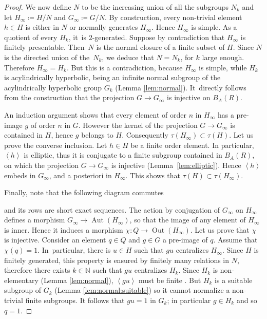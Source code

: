 \documentclass[JEP,XML,SOM,Unicode]{cedram}
\theoremstyle{definition}
\newcommand{\Aut}{\operatorname{Aut}}
\newcommand{\Out}{\operatorname{Out}}
\begin{document}
\begin{proof}
We now define $N$ to be the increasing union of all the subgroups $N_k$ and let $H_\infty \coloneqq H/N$ and $G_\infty \coloneqq G/N$.
By construction, every non-trivial element $h \in H$ is either in $N$ or normally generates $H_\infty$.
Hence $H_\infty$ is simple.
As a quotient of every $H_k$, it~is $2$-generated.
Suppose by contradiction that $H_\infty$ is finitely presentable.
Then~$N$ is the normal closure of a finite subset of $H$.
Since $N$ is the directed union of the~$N_k$, we deduce that $N = N_k$, for $k$ large enough.
Therefore $H_\infty = H_k$.
But this is a contradiction, because $H_\infty$ is simple, while $H_k$ is acylindrically hyperbolic, being an infinite normal subgroup of the acylindrically hyperbolic group $G_k$ (Lemma \ref{lem:normal}).
It~directly follows from the construction that the projection $G \to G_\infty$ is injective on $B_A(R)$.

An induction argument shows that every element of order $n$ in $H_\infty$ has a pre-image $g$ of order $n$ in $G$.
However the kernel of the projection $G \to G_\infty$ is contained in $H$, hence $g$ belongs to $H$.
Consequently $\tau(H_\infty) \subset \tau(H)$.
Let us prove the converse inclusion.
Let $h \in H$ be a finite order element.
In particular, $\left<h \right>$ is elliptic, thus it is conjugate to a finite subgroup contained in $B_A(R)$, on which the projection $G \to G_\infty$ is injective (Lemma~\ref{lem:elliptic}).
Hence $\left< h \right>$ embeds in $G_\infty$, and a posteriori in $H_\infty$. This shows that $\tau(H) \subset \tau(H_\infty)$.

Finally, note that the following diagram commutes
\begin{center}
\end{center}
and its rows are short exact sequences.
The action by conjugation of $G_\infty$ on $H_\infty$ defines a morphism $G_\infty \to \Aut(H_\infty)$, so that the image of any element of $H_\infty$ is inner.
Hence it induces a morphism $\chi \colon Q \to \Out(H_\infty)$.
Let us prove that $\chi$ is injective.
Consider an element $q \in Q$ and $g \in G$ a pre-image of $q$.
Assume that $\chi(q) = 1$.
In~particular, there is $u \in H$ such that $gu$ centralizes $H_\infty$.
Since $H$ is finitely generated, this property is ensured by finitely many relations in $N$, therefore there exists $k \in \mathbb N$ such that $gu$ centralizes $H_k$.
Since $H_k$ is non-elementary (Lemma \ref{lem:normal}), $\left<gu\right>$ must be finite \cite[Prop.\,6]{WPD}. But $H_k$ is a suitable subgroup of $G_k$ (Lemma \ref{lem:normal:suitable}) so it cannot normalize a non-trivial finite subgroups. It follows that $gu = 1$ in $G_k$; in particular $g \in H_k$ and so $q = 1$.
\end{proof}
\end{document}
